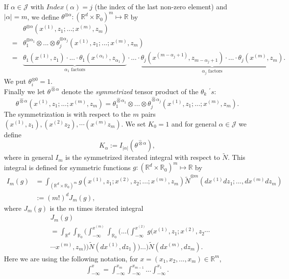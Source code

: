\documentclass[12pt]{article}%
\numberwithin{equation}{section}
\def\R{\mathbb{R}}
\begin{document}
If $\alpha \in \mathcal{J}$ with $Index(\alpha )=j$  (the index of the last non-zero element) and $\left\vert \alpha
\right\vert =m$, we define $\theta ^{\otimes \alpha }: (\R^d \times \R_0)^m \mapsto \R$ by
\begin{eqnarray}
&&\theta ^{\otimes \alpha }(x^{(1)},z_{1};...;x^{(m)},z_{m}) \\
&=&\theta _{1}^{\otimes \alpha _{1}}\otimes ...\otimes \theta _{j}^{\otimes
\alpha _{j}}(x^{(1)},z_{1};... ;x^{(m)},z_{m})  \nonumber \\
&=&\underset{\alpha _{1}\text{ factors}}{\underbrace{\theta
_{1}(x^{(1)},z_{1})\cdot ...\cdot \theta _{1}(x^{(\alpha _{1})},z_{\alpha _{1}})}
}\cdot ...\cdot \underset{\alpha _{j}\text{ factors}}{\underbrace{\theta
_{j}(x^{(m-\alpha _{j}+1)},z_{m-\alpha _{j}+1})\cdot ...\cdot \theta
_{j}(x^{(m)},z_{m})}}.  \nonumber
\end{eqnarray}
We put $\theta _{i}^{\otimes 0}=1.$\\
Finally we let $\theta ^{\hat{\otimes }\alpha }$ denote the
\emph{symmetrized} tensor product of the $\theta _{k}$ $^{\prime }s:$
\begin{equation}
\theta ^{\hat{\otimes }\alpha }(x^{(1)},z_{1};...;x^{(m)},z_{m})
=\theta_{1}^{\hat{\otimes }\alpha _{1}}\otimes ...\otimes
\theta _{j}^{\hat{\otimes }\alpha _{j}}(x^{(1)},z_{1};...;x^{(m)},z_{m}).  
\end{equation}
The symmetrization is with respect to the $m$ pairs $(x^{(1)},z_1), (x^{(2)}z_2), \cdots (x^{(m)}z_m)$.
We set $K_0=1$ and for general $\alpha \in \mathcal{J}$ we define
\begin{equation}
K_{\alpha }:= I_{\left\vert \alpha \right\vert }\left(
\theta ^{\hat{\otimes }\alpha }\right),
\end{equation}
where in general $I_m$ is the symmetrized iterated integral with respect to $\widetilde{N}$. This integral is defined for symmetric functions $g: (\R^d \times \R_0)^m \mapsto \R$ by
\begin{align}
   I_m(g) &= \int_{(\R^d \times \R_0)^m } g(x^{(1)},z_1; x^{(2)},z_2; ... ;x^{(m)},z_m) \widetilde{N}^{\otimes m}(dx^{(1)} dz_1; ..., dx^{(m)} dz_m)\nonumber\\
   &:= (m!)^{d} J_m(g), 
\end{align}
where $J_m(g)$ is the $m$ times iterated integral
\begin{align}
    &J_m(g)\nonumber\\
    &=\int_{\R^d}\int_{\R_0} \Big(\int_{-\infty}^{x^{(m)}} \int_{\R_0}\Big( ... \Big(\int_{-\infty}^{x^{(2)}}g(x^{(1)},z_1; x^{(2)},z_2\cdots \nonumber\\
    &\cdots x^{(m)},z_m) ) \widetilde{N}(dx^{(1)},dz_1)\Big)  ... \Big) \widetilde{N}(dx^{(m)},dz_m). 
\end{align}
Here we are using the following notation, for $x=(x_1,x_2, ... ,x_m) \in \R^m$,
\begin{align}
    \int_{-\infty}^x= \int_{-\infty}^{x_m} \int_{-\infty}^{x_{m-1}}  ... \int_{-\infty}^{x_1}. 
\end{align}
\end{document}
